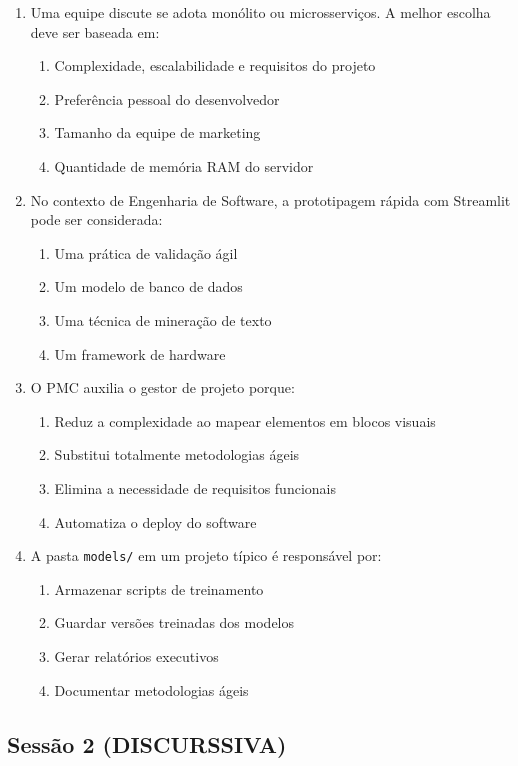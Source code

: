 \documentclass[12pt,a4paper]{article}
\begin{document}
\begin{enumerate}
\item Uma equipe discute se adota monólito ou microsserviços. A melhor escolha deve ser baseada em:
\begin{enumerate}[label=\alph*)]
\item Complexidade, escalabilidade e requisitos do projeto
\item Preferência pessoal do desenvolvedor
\item Tamanho da equipe de marketing
\item Quantidade de memória RAM do servidor
\end{enumerate}

\item No contexto de Engenharia de Software, a prototipagem rápida com Streamlit pode ser considerada:
\begin{enumerate}[label=\alph*)]
\item Uma prática de validação ágil
\item Um modelo de banco de dados
\item Uma técnica de mineração de texto
\item Um framework de hardware
\end{enumerate}

\item O PMC auxilia o gestor de projeto porque:
\begin{enumerate}[label=\alph*)]
\item Reduz a complexidade ao mapear elementos em blocos visuais
\item Substitui totalmente metodologias ágeis
\item Elimina a necessidade de requisitos funcionais
\item Automatiza o deploy do software
\end{enumerate}

\item A pasta \texttt{models/} em um projeto típico é responsável por:
\begin{enumerate}[label=\alph*)]
\item Armazenar scripts de treinamento
\item Guardar versões treinadas dos modelos
\item Gerar relatórios executivos
\item Documentar metodologias ágeis
\end{enumerate}

\end{enumerate}


\subsection*{Sessão 2 (DISCURSSIVA) }
\end{document}
